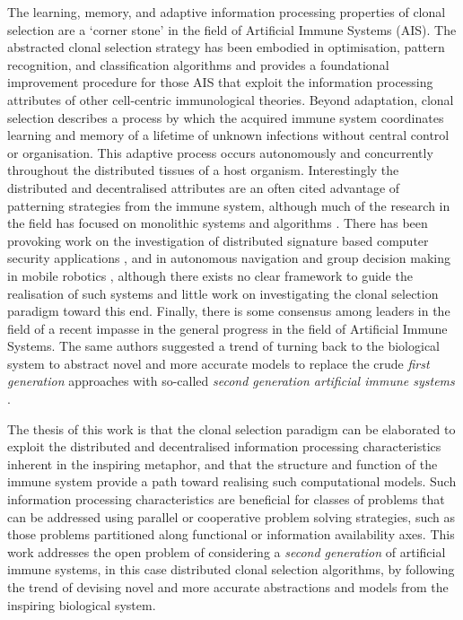 The learning, memory, and adaptive information processing properties of clonal selection are a `corner stone' in the field of Artificial Immune Systems (AIS). The abstracted clonal selection strategy has been embodied in optimisation, pattern recognition, and classification algorithms and provides a foundational improvement procedure for those AIS that exploit the information processing attributes of other cell-centric immunological theories. Beyond adaptation, clonal selection describes a process by which the acquired immune system coordinates learning and memory of a lifetime of unknown infections without central control or organisation. This adaptive process occurs autonomously and concurrently throughout the distributed tissues of a host organism. Interestingly the distributed and decentralised attributes are an often cited advantage of patterning strategies from the immune system, although much of the research in the field has focused on monolithic systems and algorithms \cite{Watkins2003, Watkins2004}. There has been provoking work on the investigation of distributed signature based computer security applications \cite{Hofmeyr1999a, Kim2002}, and in autonomous navigation and group decision making in mobile robotics \cite{Jun1999, Singh2001, Lau2006}, although there exists no clear framework to guide the realisation of such systems and little work on investigating the clonal selection paradigm toward this end. Finally, there is some consensus among leaders in the field of a recent impasse in the general progress in the field of Artificial Immune Systems. The same authors suggested a trend of turning back to the biological system to abstract novel and more accurate models to replace the crude \emph{first generation} approaches with so-called \emph{second generation artificial immune systems} \cite{Andrews2005, Timmis2005, Timmis2007, Twycross2007}. 

The thesis of this work is that the clonal selection paradigm can be elaborated to exploit the distributed and decentralised information processing characteristics inherent in the inspiring metaphor, and that the structure and function of the immune system provide a path toward realising such computational models. 
Such information processing characteristics are beneficial for classes of problems that can be addressed using parallel or cooperative problem solving strategies, such as those problems partitioned along functional or information availability axes. 
This work addresses the open problem of considering a \emph{second generation} of artificial immune systems, in this case distributed clonal selection algorithms, by following the trend of devising novel and more accurate abstractions and models from the inspiring biological system.

